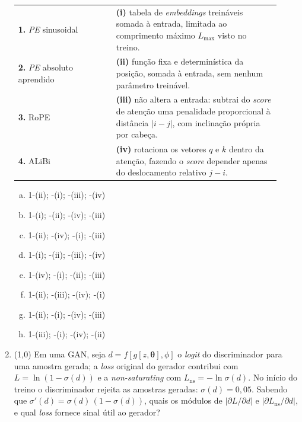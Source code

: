 \documentclass[11pt,a4paper]{article}
\newcommand{\thetav}{\boldsymbol{\theta}}
\begin{document}
\begin{enumerate}[1)]
\begin{center}
\begin{tabular}{p{0.34\linewidth} p{0.58\linewidth}}
\textbf{1.} \textit{PE} sinusoidal & \textbf{(i)} tabela de \textit{embeddings} treináveis somada à entrada, limitada ao comprimento máximo $L_{\text{max}}$ visto no treino. \\
\textbf{2.} \textit{PE} absoluto aprendido & \textbf{(ii)} função fixa e determinística da posição, somada à entrada, sem nenhum parâmetro treinável. \\
\textbf{3.} RoPE & \textbf{(iii)} não altera a entrada: subtrai do \textit{score} de atenção uma penalidade proporcional à distância $|i - j|$, com inclinação própria por cabeça. \\
\textbf{4.} ALiBi & \textbf{(iv)} rotaciona os vetores $q$ e $k$ dentro da atenção, fazendo o \textit{score} depender apenas do deslocamento relativo $j - i$. \\
\end{tabular}
\end{center}

\begin{enumerate}[a)]
    \item 1-(ii); -(i); -(iii); -(iv)
    \item 1-(i); -(ii); -(iv); -(iii)
    \item 1-(ii); -(iv); -(i); -(iii)
    \item 1-(i); -(ii); -(iii); -(iv)
    \item 1-(iv); -(i); -(ii); -(iii)
    \item 1-(ii); -(iii); -(iv); -(i)
    \item 1-(ii); -(i); -(iv); -(iii)
    \item 1-(iii); -(i); -(iv); -(ii)
\end{enumerate}

\item (1{,}0) Em uma GAN, seja $d = f[g[z,\thetav],\phi]$ o \textit{logit} do discriminador para uma amostra gerada; a \textit{loss} original do gerador contribui com $L = \ln(1 - \sigma(d))$ e a \textit{non-saturating} com $L_{\text{ns}} = -\ln \sigma(d)$. No início do treino o discriminador rejeita as amostras geradas: $\sigma(d) = 0{,}05$. Sabendo que $\sigma'(d) = \sigma(d)\,(1 - \sigma(d))$, quais os módulos de $\left|\partial L / \partial d\right|$ e $\left|\partial L_{\text{ns}} / \partial d\right|$, e qual \textit{loss} fornece sinal útil ao gerador?


\end{enumerate}
\end{document}

